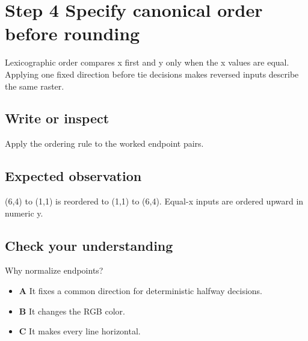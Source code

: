 \section{Step 4 Specify canonical order before
  rounding}\label{007-bresenham-line-s04-step-4-specify-canonical-order-before-rounding}

Lexicographic order compares x first and y only when the x values are
equal. Applying one fixed direction before tie decisions makes reversed
inputs describe the same raster.

\subsection{Write or
  inspect}\label{007-bresenham-line-s04-write-or-inspect}

Apply the ordering rule to the worked endpoint pairs.

\subsection{Expected
  observation}\label{007-bresenham-line-s04-expected-observation}

(6,4) to (1,1) is reordered to (1,1) to (6,4). Equal-x inputs are
ordered upward in numeric y.

\subsection{Check your
  understanding}\label{007-bresenham-line-s04-check-your-understanding}

Why normalize endpoints?

\begin{itemize}
  \tightlist
  \item
        \textbf{A} It fixes a common direction for deterministic halfway
        decisions.
  \item
        \textbf{B} It changes the RGB color.
  \item
        \textbf{C} It makes every line horizontal.
\end{itemize}
